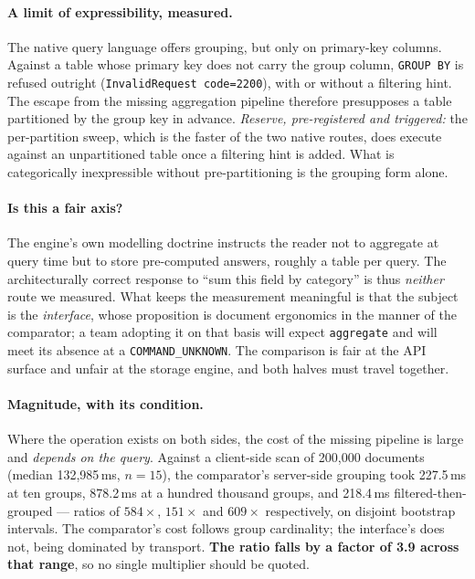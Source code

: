 \documentclass[11pt,a4paper]{article}
\newcommand{\code}[1]{\texttt{\small #1}}
\begin{document}
\paragraph{A limit of expressibility, measured.} The native query language offers grouping, but only
on primary-key columns. Against a table whose primary key does not carry the group column,
\code{GROUP BY} is refused outright (\code{InvalidRequest code=2200}), with or without a filtering
hint. The escape from the missing aggregation pipeline therefore presupposes a table partitioned by
the group key in advance. \emph{Reserve, pre-registered and triggered:} the per-partition sweep,
which is the faster of the two native routes, does execute against an unpartitioned table once a
filtering hint is added. What is categorically inexpressible without pre-partitioning is the
grouping form alone.

\paragraph{Is this a fair axis?} The engine's own modelling doctrine instructs the reader not to
aggregate at query time but to store pre-computed answers, roughly a table per query. The
architecturally correct response to ``sum this field by category'' is thus \emph{neither} route we
measured. What keeps the measurement meaningful is that the subject is the \emph{interface}, whose
proposition is document ergonomics in the manner of the comparator; a team adopting it on that basis
will expect \code{aggregate} and will meet its absence at a \code{COMMAND\_UNKNOWN}. The comparison
is fair at the API surface and unfair at the storage engine, and both halves must travel together.

\paragraph{Magnitude, with its condition.} Where the operation exists on both sides, the cost of the
missing pipeline is large and \emph{depends on the query}. Against a client-side scan of 200{,}000
documents (median 132{,}985\,ms, $n=15$), the comparator's server-side grouping took 227.5\,ms at
ten groups, 878.2\,ms at a hundred thousand groups, and 218.4\,ms filtered-then-grouped --- ratios
of $584\times$, $151\times$ and $609\times$ respectively, on disjoint bootstrap intervals. The
comparator's cost follows group cardinality; the interface's does not, being dominated by transport.
\textbf{The ratio falls by a factor of 3.9 across that range}, so no single multiplier should be
quoted.
\end{document}
